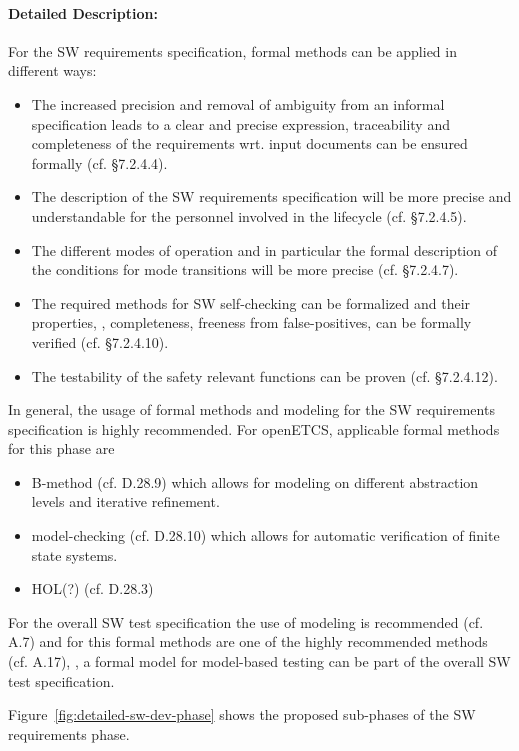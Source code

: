 \paragraph{Detailed Description:}
\label{sec:sw-req-deta-descr}
For the SW requirements specification, formal methods can be applied in
different ways:
\begin{itemize}
\item The increased precision and removal of ambiguity from an informal
  specification leads to a clear and precise expression, traceability and
  completeness of the requirements wrt. input documents can be ensured formally
  (cf. §7.2.4.4).
\item The description of the SW requirements specification will be more precise
  and understandable for the personnel involved in the lifecycle (cf. §7.2.4.5).
\item The different modes of operation and in particular the formal description
  of the conditions for mode transitions will be more precise (cf. §7.2.4.7).
\item The required methods for SW self-checking can be formalized and their
  properties, \eg, completeness, freeness from false-positives, can be formally
  verified (cf. §7.2.4.10).
\item The testability of the safety relevant functions can be proven
  (cf. §7.2.4.12).
\end{itemize}
In general, the usage of formal methods and modeling for the SW requirements
specification is highly recommended. For openETCS, applicable formal methods for
this phase are

\begin{itemize}
\item B-method (cf. D.28.9) which allows for modeling on different abstraction
  levels and iterative refinement.
\item model-checking (cf. D.28.10) which allows for automatic verification of
  finite state systems.
\item HOL(?) (cf. D.28.3)
\end{itemize}

For the overall SW test specification the use of modeling is recommended
(cf. A.7) and for this formal methods are one of the highly recommended methods
(cf. A.17), \ie, a formal model for model-based testing can be part of the
overall SW test specification.

Figure~\ref{fig:detailed-sw-dev-phase} shows the proposed sub-phases of the SW
requirements phase.

